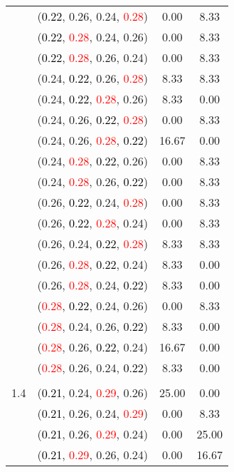 \documentclass[10pt,a4paper]{report}
\begin{document}
\begin{center}
\begin{longtable}{clcc}
			&(\textcolor{black}{0.22}, 0.26, 0.24, \textcolor{red}{0.28})&0.00&8.33\\
			&(\textcolor{black}{0.22}, \textcolor{red}{0.28}, 0.24, 0.26)&0.00&8.33\\
			&(\textcolor{black}{0.22}, \textcolor{red}{0.28}, 0.26, 0.24)&0.00&8.33\\
			&(0.24, \textcolor{black}{0.22}, 0.26, \textcolor{red}{0.28})&8.33&8.33\\
			&(0.24, \textcolor{black}{0.22}, \textcolor{red}{0.28}, 0.26)&8.33&0.00\\
			&(0.24, 0.26, \textcolor{black}{0.22}, \textcolor{red}{0.28})&0.00&8.33\\
			&(0.24, 0.26, \textcolor{red}{0.28}, \textcolor{black}{0.22})&16.67&0.00\\
			&(0.24, \textcolor{red}{0.28}, \textcolor{black}{0.22}, 0.26)&0.00&8.33\\
			&(0.24, \textcolor{red}{0.28}, 0.26, \textcolor{black}{0.22})&0.00&8.33\\
			&(0.26, \textcolor{black}{0.22}, 0.24, \textcolor{red}{0.28})&0.00&8.33\\
			&(0.26, \textcolor{black}{0.22}, \textcolor{red}{0.28}, 0.24)&0.00&8.33\\
			&(0.26, 0.24, \textcolor{black}{0.22}, \textcolor{red}{0.28})&8.33&8.33\\
			&(0.26, \textcolor{red}{0.28}, \textcolor{black}{0.22}, 0.24)&8.33&0.00\\
			&(0.26, \textcolor{red}{0.28}, 0.24, \textcolor{black}{0.22})&8.33&0.00\\
			&(\textcolor{red}{0.28}, \textcolor{black}{0.22}, 0.24, 0.26)&0.00&8.33\\
			&(\textcolor{red}{0.28}, 0.24, 0.26, \textcolor{black}{0.22})&8.33&0.00\\
			&(\textcolor{red}{0.28}, 0.26, \textcolor{black}{0.22}, 0.24)&16.67&0.00\\
			&(\textcolor{red}{0.28}, 0.26, 0.24, \textcolor{black}{0.22})&8.33&0.00\\
		&&&\\
		1.4			&(\textcolor{black}{0.21}, 0.24, \textcolor{red}{0.29}, 0.26)&25.00&0.00\\
			&(\textcolor{black}{0.21}, 0.26, 0.24, \textcolor{red}{0.29})&0.00&8.33\\
			&(\textcolor{black}{0.21}, 0.26, \textcolor{red}{0.29}, 0.24)&0.00&25.00\\
			&(\textcolor{black}{0.21}, \textcolor{red}{0.29}, 0.26, 0.24)&0.00&16.67\\

\end{longtable}
\end{center}
\end{document}
